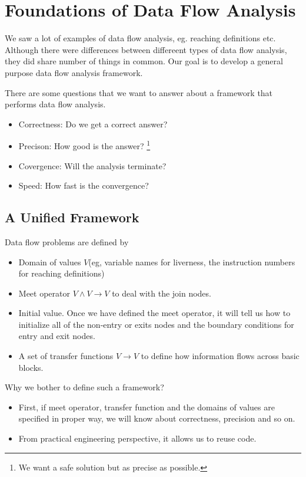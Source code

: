 \newpage

\section{Foundations of Data Flow Analysis}



We saw a lot of examples of data flow analysis, eg. reaching definitions etc. Although
there were differences between differeent types of data flow analysis, they did share number of
things in common. Our goal is to develop a general purpose data flow analysis framework.


There are some questions that we want to answer about a framework that performs data
flow analysis.

\begin{itemize}
	\item Correctness: Do we get a correct answer?
	\item Precison: How good is the answer? \footnote{We want a safe solution but as precise as possible. }
	\item Covergence: Will the analysis terminate?
	\item Speed: How fast is the convergence?
\end{itemize}



\subsection{A Unified Framework}

Data flow problems are defined by
\begin{itemize}

	\item Domain of values \( V \)(eg, variable names for liverness, the instruction numbers for reaching definitions)
	\item Meet operator \( V \wedge V \rightarrow V \) to deal with the join nodes.
	\item Initial value. Once we have defined the meet operator, it will tell us how to initialize
	      all of the non-entry or exits nodes and the boundary conditions for entry and exit nodes.
	\item A set of transfer functions \( V  \rightarrow V \) to define how information flows across basic blocks.
\end{itemize}



Why we bother to define such a framework?
\begin{itemize}
	\item First, if meet operator, transfer function and the domains of values are specified in proper way, we will know about
	      correctness, precision and so on.

	\item From practical engineering perspective, it allows us to reuse code.
\end{itemize}


